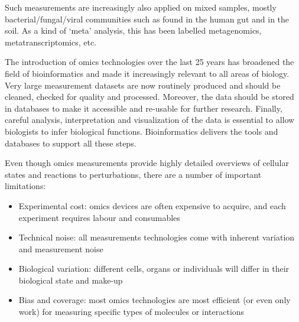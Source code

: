 Such measurements are increasingly also applied on mixed samples, mostly
bacterial/fungal/viral communities such as found in the human gut and in the soil.
As a kind of `meta' analysis, this has been labelled metagenomics,
metatranscriptomics, etc.

The introduction of omics technologies over the last 25 years has broadened
the field of bioinformatics and made it increasingly relevant to all areas
of biology. Very large measurement datasets are now routinely produced and
should be cleaned, checked for quality and processed.
Moreover, the data should be stored in databases to make it accessible and
re-usable for further research. Finally, careful analysis, interpretation and
visualization of the data is essential to allow biologists to infer
biological functions. Bioinformatics delivers the tools and databases to
support all these steps.

Even though omics measurements provide highly detailed overviews of
cellular states and reactions to perturbations, there are a number of
important limitations:

\begin{itemize}
\item Experimental cost: omics devices are often expensive to acquire, and each
experiment requires labour and consumables
\item Technical noise: all measurements technologies come with inherent variation and
measurement noise
\item Biological variation: different cells, organs or individuals will differ
in their biological state and make-up
\item Bias and coverage: most omics technologies are most efficient (or even
only work) for measuring specific types of molecules or interactions
\end{itemize}


